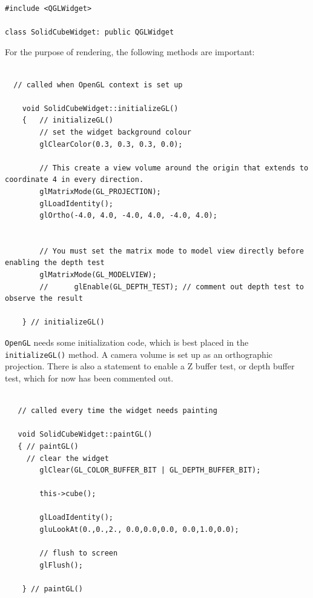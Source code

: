 \documentclass[a4wide]{article}
\begin{document}
\begin{lstlisting}

#include <QGLWidget>

class SolidCubeWidget: public QGLWidget
\end{lstlisting} 

For the purpose of rendering, the following methods are important:
\begin{lstlisting}

  // called when OpenGL context is set up
  
    void SolidCubeWidget::initializeGL()
    {   // initializeGL()                                                                                                                                                    
        // set the widget background colour                                                                                                                            
        glClearColor(0.3, 0.3, 0.3, 0.0);

        // This create a view volume around the origin that extends to coordinate 4 in every direction.
        glMatrixMode(GL_PROJECTION);
        glLoadIdentity();
        glOrtho(-4.0, 4.0, -4.0, 4.0, -4.0, 4.0);


        // You must set the matrix mode to model view directly before enabling the depth test
        glMatrixMode(GL_MODELVIEW);
        //      glEnable(GL_DEPTH_TEST); // comment out depth test to observe the result                                                                                        

    } // initializeGL()  
\end{lstlisting}
\texttt{OpenGL} needs some initialization code, which is best placed in the \texttt{initializeGL()} method. A camera volume is set up as an orthographic projection.
There is also a statement to enable a Z buffer test, or depth buffer test, which for now has been commented out.

\begin{lstlisting}

   // called every time the widget needs painting
  
   void SolidCubeWidget::paintGL()
   { // paintGL()                                                                                                                                                               
     // clear the widget                                                                                                                                                          
        glClear(GL_COLOR_BUFFER_BIT | GL_DEPTH_BUFFER_BIT);

        this->cube();

        glLoadIdentity();
        gluLookAt(0.,0.,2., 0.0,0.0,0.0, 0.0,1.0,0.0);

        // flush to screen                                                                                                                                                        
        glFlush();

    } // paintGL() 
\end{lstlisting}
\end{document}
